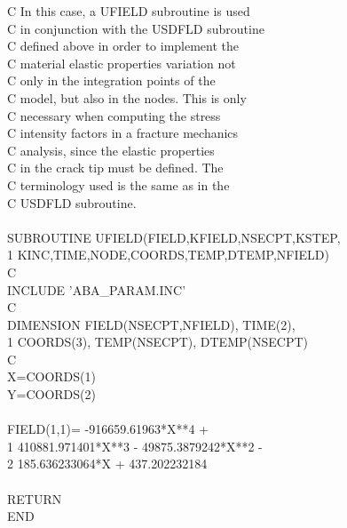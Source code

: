 {C In this case, a UFIELD subroutine is used \\ 
C in conjunction with the USDFLD subroutine \\
C defined above in order to implement the \\
C material elastic properties variation not \\
C only in the integration points of the \\
C model, but also in the nodes. This is only\\ 
C necessary when computing the stress \\
C intensity factors in a fracture mechanics \\
C analysis, since the elastic properties \\
C in the crack tip must be defined. The\\
C terminology used is the same as in the \\ 
C USDFLD subroutine.\\\\
SUBROUTINE UFIELD(FIELD,KFIELD,NSECPT,KSTEP,\\
1 KINC,TIME,NODE,COORDS,TEMP,DTEMP,NFIELD)\\
C\\
INCLUDE 'ABA\_PARAM.INC'\\
C\\
DIMENSION FIELD(NSECPT,NFIELD), TIME(2), \\
1 COORDS(3), TEMP(NSECPT), DTEMP(NSECPT)\\
C\\
X=COORDS(1)\\
Y=COORDS(2)\\\\
FIELD(1,1)= -916659.61963*X**4 + \\
1 410881.971401*X**3 - 49875.3879242*X**2 -\\
2 185.636233064*X + 437.202232184\\\\
RETURN\\
END}






